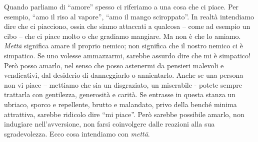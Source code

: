 
Quando parliamo di ``amore'' spesso ci riferiamo a una cosa che ci piace.
Per esempio, ``amo il riso al vapore'', ``amo il mango sciroppato''. In
realtà intendiamo dire che ci piacciono, ossia che siamo attaccati a
qualcosa – come ad esempio un cibo – che ci piace molto o che gradiamo
mangiare. Ma non è che lo amiamo. \textit{Mettā} significa amare il proprio
nemico; non significa che il nostro nemico ci è simpatico. Se uno
volesse ammazzarmi, sarebbe assurdo dire che mi è simpatico! Però posso
amarlo, nel senso che posso astenermi da pensieri malevoli e
vendicativi, dal desiderio di danneggiarlo o annientarlo. Anche se una
persona non vi piace – mettiamo che sia un disgraziato, un miserabile -
potete sempre trattarla con gentilezza, generosità e carità. Se entrasse
in questa stanza un ubriaco, sporco e repellente, brutto e malandato,
privo della benché minima attrattiva, sarebbe ridicolo dire ``mi piace''.
Però sarebbe possibile amarlo, non indugiare nell'avversione, non farsi
coinvolgere dalle reazioni alla sua sgradevolezza. Ecco cosa intendiamo
con \textit{mettā}.

